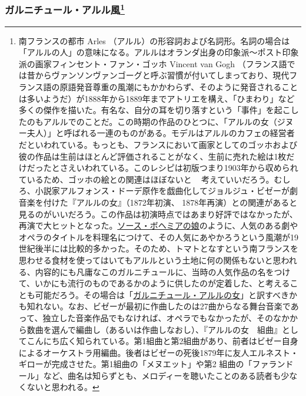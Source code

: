 \begin{recette}
{\subsubsection[ガルニチュール・アルル風]{\texorpdfstring{ガルニチュール・アルル風\footnote{南フランスの都市
  Arles
  （アルル）の形容詞および名詞形。名詞の場合は「アルルの人」の意味になる。アルルはオランダ出身の印象派〜ポスト印象派の画家フィンセント・ファン・ゴッホ
  Vincent van Gogh
  （フランス語では昔からヴァンソンヴァンゴーグと呼ぶ習慣が付いてしまっており、現代フランス語の原語発音尊重の風潮にもかかわらず、そのように発音されることは多いようだ）が1888年から1889年までアトリエを構え、「ひまわり」など多くの傑作を描いた。有名な、自分の耳を切り落すという「事件」を起こしたのもアルルでのことだ。この時期の作品のひとつに、「アルルの女（ジヌー夫人）」と呼ばれる一連のものがある。モデルはアルルのカフェの経営者だといわれている。もっとも、フランスにおいて画家としてのゴッホおよび彼の作品は生前はほとんど評価されることがなく、生前に売れた絵は1枚だけだったとさえいわれている。このレシピは初版つまり1903年から収められているため、ゴッホの絵との関連はほぼないと
  ~
  考えていいだろう。むしろ、小説家アルフォンス・ドーデ原作を戯曲化してジョルジュ・ビゼーが劇音楽を付けた『アルルの女』（1872年初演、
  1878年再演）との関連があると見るのがいいだろう。この作品は初演時点ではあまり好評ではなかったが、再演で大ヒットとなった。\protect\hyperlink{sauce-bohemienne}{ソース・ボヘミアの娘}のように、人気のある劇やオペラのタイトルを料理名につけて、その人気にあやかろうという風潮が19世紀後半には比較的多かった。そのため、トマトとなすという南フランスを思わせる食材を使ってはいてもアルルという土地に何の関係もないと思われる、内容的にも凡庸なこのガルニチュールに、当時の人気作品の名をつけて、いかにも流行のものであるかのように供したのが定着した、と考えることも可能だろう。その場合は「\ul{ガルニチュール・アルルの女}」と訳すべきかも知れない。なお、ビゼーが最初に作曲したのは27曲からなる舞台音楽であって、独立した音楽作品でもなければ、オペラでもなかったが、そのなかから数曲を選んで編曲し（あるいは作曲しなおし）、『アルルの女　組曲』としてこんにち広く知られている。第1組曲と第2組曲があり、前者はビゼー自身によるオーケストラ用編曲。後者はビゼーの死後1879年に友人エルネスト・ギローが完成させた。第1組曲の「メヌエット」や第2
  組曲の「ファランドール」など、曲名は知らずとも、メロディーを聴いたことのある読者も少なくないと思われる。}}{ガルニチュール・アルル風}}\label{garniture-arlesienne}}




\end{recette}
